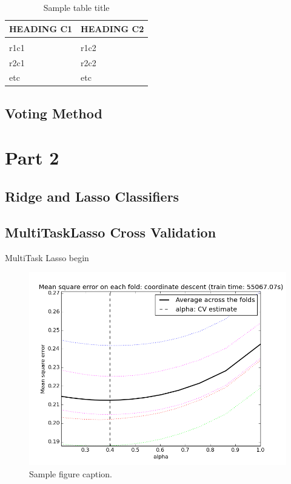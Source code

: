 \documentclass{article} %
\begin{document}
\begin{table}[H]
\caption{Sample table title}
\label{sample-table}
\begin{center}
\begin{tabular}{ll}
\multicolumn{1}{c}{\bf HEADING C1}  &\multicolumn{1}{c}{\bf HEADING C2}
\\ \hline \\
r1c1   &r1c2       \\
r2c1   &r2c2 \\
etc		&etc\\
\end{tabular}
\end{center}
\end{table}

\subsection{Voting Method}

\section{Part 2}
\subsection{Ridge and Lasso Classifiers}
\subsection{MultiTaskLasso Cross Validation}

MultiTask Lasso begin


\begin{figure}[H]
\begin{center}
\includegraphics[scale=.5]{media/cross_validation_figure_2.png}
\end{center}
\caption{Sample figure caption.}
\end{figure}
\end{document}
